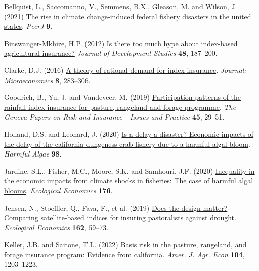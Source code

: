 \documentclass[
  letterpaper,
  DIV=11,
  numbers=noendperiod]{scrartcl}
\newlength{\cslhangindent}
\newlength{\cslentryspacingunit} %
\newenvironment{CSLReferences}[2] %
 {%
  \setlength{\parindent}{0pt}
  \ifodd #1
  \let\oldpar\par
  \def\par{\hangindent=\cslhangindent\oldpar}
  \fi
  \setlength{\parskip}{#2\cslentryspacingunit}
 }%
 {}
\begin{document}
\hypertarget{refs}{}
\begin{CSLReferences}{1}{0}
\leavevmode{}%
Bellquist, L., Saccomanno, V., Semmens, B.X., Gleason, M. and Wilson, J.
(2021) \href{https://doi.org/10.7717/peerj.11186}{The rise in climate
change-induced federal fishery disasters in the united states}.
\emph{PeerJ} \textbf{9}.

\leavevmode{}%
Binswanger-Mkhize, H.P. (2012)
\href{https://doi.org/10.1080/00220388.2011.625411}{Is there too much
hype about index-based agricultural insurance?} \emph{Journal of
Development Studies} \textbf{48}, 187--200.

\leavevmode{}%
Clarke, D.J. (2016) \href{https://doi.org/10.1257/mic.20140103}{A theory
of rational demand for index insurance}. \emph{Journal: Microeconomics}
\textbf{8}, 283--306.

\leavevmode{}%
Goodrich, B., Yu, J. and Vandeveer, M. (2019)
\href{https://doi.org/10.1057/s41288-019-00149-3}{Participation patterns
of the rainfall index insurance for pasture, rangeland and forage
programme}. \emph{The Geneva Papers on Risk and Insurance - Issues and
Practice} \textbf{45}, 29--51.

\leavevmode{}%
Holland, D.S. and Leonard, J. (2020)
\href{https://doi.org/10.1016/j.hal.2020.101904}{Is a delay a disaster?
Economic impacts of the delay of the california dungeness crab fishery
due to a harmful algal bloom}. \emph{Harmful Algae} \textbf{98}.

\leavevmode{}%
Jardine, S.L., Fisher, M.C., Moore, S.K. and Samhouri, J.F. (2020)
\href{https://doi.org/10.1016/j.ecolecon.2020.106691}{Inequality in the
economic impacts from climate shocks in fisheries: The case of harmful
algal blooms}. \emph{Ecological Economics} \textbf{176}.

\leavevmode{}%
Jensen, N., Stoeffler, Q., Fava, F., et al. (2019)
\href{https://doi.org/10.1016/J.ECOLECON.2019.04.014}{Does the design
matter? Comparing satellite-based indices for insuring pastoralists
against drought}. \emph{Ecological Economics} \textbf{162}, 59--73.

\leavevmode{}%
Keller, J.B. and Saitone, T.L. (2022)
\href{https://doi.org/10.1111/ajae.12282}{Basis risk in the pasture,
rangeland, and forage insurance program: Evidence from california}.
\emph{Amer. J. Agr. Econ} \textbf{104}, 1203--1223.


\end{CSLReferences}
\end{document}
